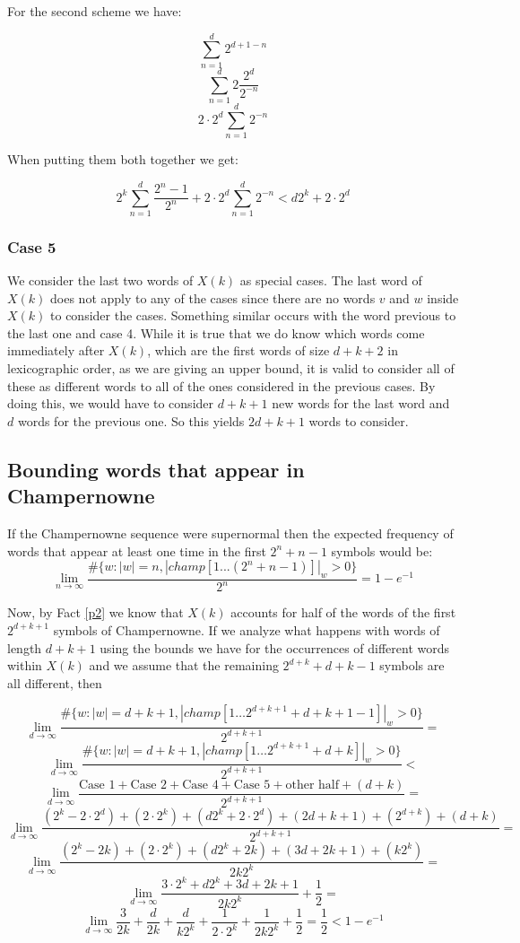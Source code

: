 \documentclass[11pt,a4paper]{tesis}
\theoremstyle{definition}
\begin{document}
For the second scheme we have:

$$ \sum_{n=1}^{d} 2^{d + 1 - n}$$
$$ \sum_{n=1}^{d} 2 \frac{2^d}{2^{- n}}$$
$$ 2 \cdot 2^d \sum_{n=1}^{d} 2^{- n}$$

When putting them both together we get:

$$  2^k \sum_{n=1}^{d} \frac{2^n - 1}{2^n}  + 2 \cdot 2^d \sum_{n=1}^{d} 2^{- n} < d2^k + 2 \cdot 2^d$$

\subsubsection{Case 5}

We consider the last two words of $X(k)$ as special cases. The last word of $X(k)$ does not apply to any of the cases since there are no words $v$ and $w$ inside $X(k)$ to consider the cases. Something similar occurs with the word previous to the last one and case 4. 
While it is true that we do know which words come immediately after  $X(k)$, which are the first words of size $d+k+2$ in lexicographic order, as we are giving an upper bound, it is valid to consider all of these as different words to all of the ones considered in the previous cases.
By doing this, we would have to consider $d+k+1$ new words for the last word and $d$ words for the previous one. So this yields $2d+k+1$ words to consider.


\subsection{Bounding words that appear in Champernowne}

If the Champernowne sequence were supernormal then the expected frequency of words that appear at least one time in the first $2^n + n -1$ symbols would be:
$$\lim_{n\to\infty} \frac{\#\{w: |w| = n  , |champ[1...(2^n+n-1)]|_w > 0\}}{2^n}  = 1 - e^{-1}$$


Now, by Fact \ref{p2} we know that $X(k)$ accounts for half of the words of the first $2^{d+k+1}$ symbols of Champernowne. 
If we analyze what happens with words of length $d+k+1$ using the bounds we have for the occurrences of different words within $X(k)$ and we assume that the remaining $2^{d+k} + d + k - 1$  symbols are all different, then



$$\lim_{d\to\infty} \frac{\#\{w : |w| = d+k+1, |champ[1 \dots 2^{d+k+1}+d+k+1-1]|_w > 0 \}}{2^{d+k+1}} =$$
$$\lim_{d\to\infty} \frac{\#\{w : |w| = d+k+1, |champ[1 \dots 2^{d+k+1}+d+k]|_w > 0 \}}{2^{d+k+1}} <$$
$$\lim_{d\to\infty} \frac{ \textrm{Case 1} + \textrm{Case 2}+ \textrm{Case 4} + \textrm{Case 5} + \textrm{other half} + (d + k) }{2^{d+k+1}} =$$
$$\lim_{d\to\infty} \frac{(2^k - 2\cdot 2^d) + (2 \cdot 2^k)+ (d2^k + 2 \cdot 2^d) + (2d+k+1) + (2^{d+k}) + (d + k) }{2^{d+k+1}} =$$
$$\lim_{d\to\infty} \frac{(2^k - 2k) + (2 \cdot 2^k)+ (d2^k + 2k) + (3d+2k+1) + (k2^{k})}{2k2^{k}} =$$
$$\lim_{d\to\infty} \frac{3\cdot2^k + d2^k  + 3d+2k+1}{2k2^{k}} + \frac{1}{2} =$$
$$\lim_{d\to\infty} \frac{3}{2k} + \frac{d}{2k} + \frac{d}{k2^{k}} + \frac{1}{2\cdot2^{k}} + \frac{1}{2k2^{k}} + \frac{1}{2} = \frac{1}{2} < 1 - e^{-1}$$
\end{document}
